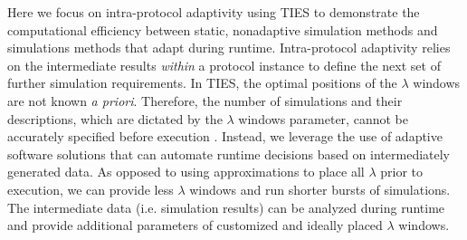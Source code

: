 Here we focus on intra-protocol adaptivity using TIES to demonstrate the 
computational efficiency between static, nonadaptive simulation methods and 
simulations methods that adapt during runtime. Intra-protocol adaptivity relies 
on the intermediate results \textit{within} a protocol instance to define the 
next set of further simulation requirements. In TIES, the optimal positions of 
the $\lambda$ windows are not known \textit{a priori}. Therefore, the number of 
simulations and their descriptions, which are dictated by the $\lambda$ windows
parameter, cannot be accurately specified before execution .
Instead, we leverage the use of adaptive software solutions that can automate
runtime decisions based on intermediately generated data. As opposed to using
approximations to place all $\lambda$ prior to execution, we can provide less 
$\lambda$ windows and run shorter bursts of simulations. The intermediate data 
(i.e. simulation results) can be analyzed during runtime and provide additional
parameters of customized and ideally placed $\lambda$ windows.   





